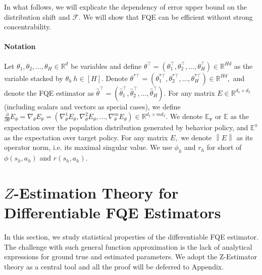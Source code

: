 \documentclass{article}
\def\mw#1{\textcolor{red}{mw:#1}}
\numberwithin{equation}{section}
\theoremstyle{plain}
\theoremstyle{definition}
\theoremstyle{remark}
\begin{document}
In what follows, we will explicate the dependency of error upper bound on the distribution shift and $\mathcal{F}$. We will show that FQE can be efficient without strong concentrability.
 
 

\paragraph{Notation} 
Let $\theta_1,\theta_2,...,\theta_H \in \mathbb{R}^d$ be variables and define $\theta^{\top} = (\theta_1^{\top},\theta_2^{\top},...,\theta_H^{\top}) \in \mathbb{R}^{Hd}$ as the variable stacked by $\theta_h \ h \in [H].$ Denote $\theta^{*\top} = (\theta_1^{*\top},\theta_2^{*\top},...,\theta_H^{*\top}) \in \mathbb{R}^{Hd},$ and denote the FQE estimator as $\widehat{\theta}^{\top} = (\widehat{\theta}_1^{\top}, \widehat{\theta}_2^{\top},...,\widehat{\theta}_H^{\top})$. For any matrix $E\in\mathbb{R}^{d_1\times d_2}$ (including scalars and vectors as special cases), we define $\frac{\partial}{\partial \theta} E_{\theta} = \nabla_\theta E_\theta = (\nabla_\theta^1 E_\theta, \nabla_\theta^2 E_\theta, \ldots, \nabla_\theta^m E_\theta)\in\mathbb{R}^{d_1\times md_2}.$  We denote $\mathbb{E}_{\boldsymbol{\tau}}$ or $\mathbb{E}$ as the expectation over the population distribution generated by behavior policy, and $\mathbb{E}^{\pi}$ as the expectation over target policy. For any matrix $E,$ we denote $\left\|E\right\|$ as its operator norm, i.e. its maximal singular value. We use $\phi_h$ and $r_h$ for short of $\phi(s_h,a_h)$ and $r(s_h,a_h).$

\section{$Z$-Estimation Theory for Differentiable FQE Estimators}\label{sec:z}


In this section, we study statistical properties of the differentiable FQE estimator. The challenge with such general function approximation is the lack of analytical expressions for ground true and estimated parameters. 
We adopt the Z-Estimator theory as a central tool and all the proof will be deferred to Appendix.
\end{document}
